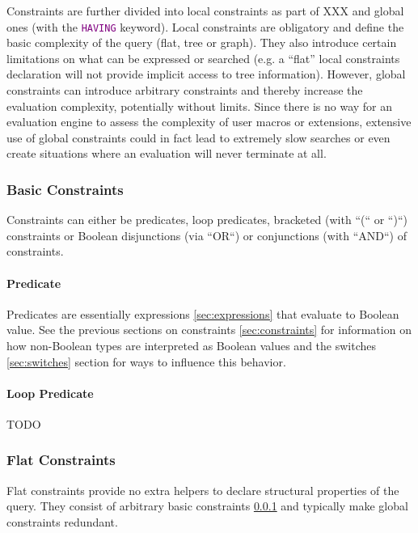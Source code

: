 \documentclass[11pt]{article}
\newcommand{\keyword}[1]{\textcolor{purple}{\texttt{#1}}}
\begin{document}
Constraints are further divided into local constraints as part of XXX  and global ones (with the \keyword{HAVING} keyword). Local constraints are obligatory and define the basic complexity of the query (flat, tree or graph). They also introduce certain limitations on what can be expressed or searched (e.g. a ``flat'' local constraints declaration will not provide implicit access to tree information). However, global constraints can introduce arbitrary constraints and thereby increase the evaluation complexity, potentially without limits. Since there is no way for an evaluation engine to assess the complexity of user macros or extensions, extensive use of global constraints could in fact lead to extremely slow searches or even create situations where an evaluation will never terminate at all.

\subsubsection{Basic Constraints}
\label{sec:basic-constraints}

Constraints can either be predicates, loop predicates, bracketed (with ``(`` or ``)``) constraints or Boolean disjunctions (via ``OR``) or conjunctions (with ``AND``) of constraints.

\paragraph{Predicate}
\label{sec:predicate}

Predicates are essentially expressions \cref{sec:expressions} that evaluate to Boolean value. See the previous sections on constraints \cref{sec:constraints} for information on how non-Boolean types are interpreted as Boolean values and the switches \cref{sec:switches} section for ways to influence this behavior.

\paragraph{Loop Predicate}

TODO

\subsubsection{Flat Constraints}
\label{sec:flat-constraints}

Flat constraints provide no extra helpers to declare structural properties of the query. They consist of arbitrary basic constraints \cref{sec:basic-constraints} and typically make global constraints redundant.
\end{document}

